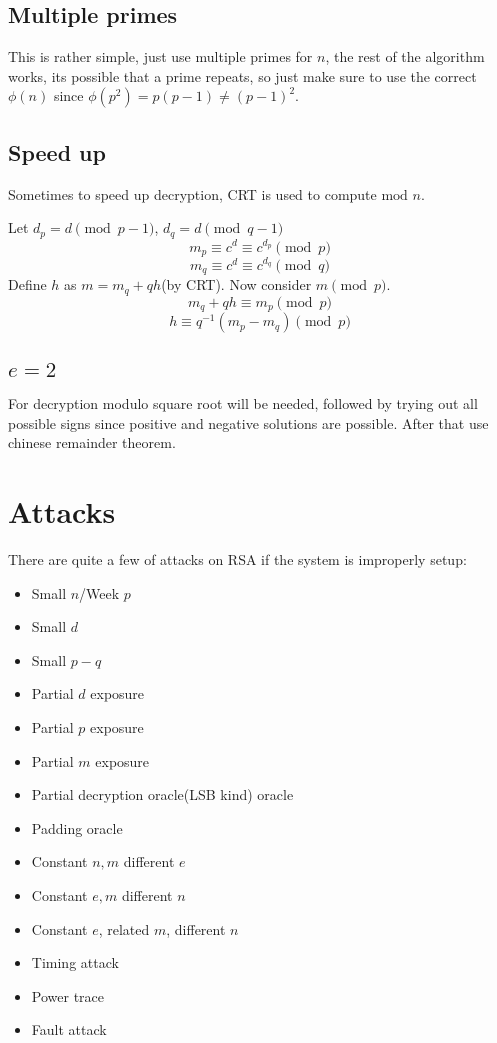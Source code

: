 \documentclass{report}
\newcommand{\tmod}{\text{mod }}
\begin{document}
\subsection{Multiple primes}
This is rather simple, just use multiple primes for $n$, the rest of the algorithm works, its possible that a prime repeats, so just make sure to use the correct $\phi(n)$ since $\phi\left(p^2\right)=p(p-1)\neq(p-1)^2$.
\subsection{Speed up}
Sometimes to speed up decryption, CRT is used to compute $\tmod n$.

Let $d_p=d\pmod{p-1}$, $d_q=d\pmod{q-1}$
$$m_p\equiv c^d\equiv c^{d_p}\pmod p$$
$$m_q\equiv c^d\equiv c^{d_q}\pmod q$$
Define $h$ as $m=m_q+qh$(by CRT). Now consider $m\pmod p$.
$$m_q+qh\equiv m_p\pmod p$$
$$h\equiv q^{-1}\left(m_p-m_q\right)\pmod p$$
\subsection{$e=2$}
For decryption modulo square root will be needed, followed by trying out all possible signs since positive and negative solutions are possible. After that use chinese remainder theorem.
\section{Attacks}
There are quite a few of attacks on RSA if the system is improperly setup:
\begin{itemize}
	\item Small $n$/Week $p$
	\item Small $d$
	\item Small $p-q$
	\item Partial $d$ exposure
	\item Partial $p$ exposure
	\item Partial $m$ exposure
	\item Partial decryption oracle(LSB kind) oracle
	\item Padding oracle
	\item Constant $n,m$ different $e$
	\item Constant $e,m$ different $n$
	\item Constant $e$, related $m$, different $n$
	\item Timing attack
	\item Power trace
	\item Fault attack
\end{itemize}
\end{document}
